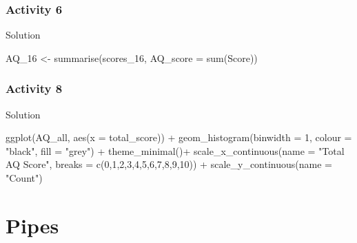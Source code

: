 \documentclass[
  oneside]{book}
\newenvironment{Shaded}{\begin{snugshade}}{\end{snugshade}}
\newcommand{\AttributeTok}[1]{\textcolor[rgb]{0.77,0.63,0.00}{#1}}
\newcommand{\DecValTok}[1]{\textcolor[rgb]{0.00,0.00,0.81}{#1}}
\newcommand{\FunctionTok}[1]{\textcolor[rgb]{0.00,0.00,0.00}{#1}}
\newcommand{\NormalTok}[1]{#1}
\newcommand{\OtherTok}[1]{\textcolor[rgb]{0.56,0.35,0.01}{#1}}
\newcommand{\SpecialCharTok}[1]{\textcolor[rgb]{0.00,0.00,0.00}{#1}}
\newcommand{\StringTok}[1]{\textcolor[rgb]{0.31,0.60,0.02}{#1}}
\begin{document}
\hypertarget{activity-6-2}{%
\subsection{Activity 6}\label{activity-6-2}}

Solution

\begin{Shaded}
\begin{Highlighting}[]
\NormalTok{AQ\_16 }\OtherTok{\textless{}{-}} \FunctionTok{summarise}\NormalTok{(scores\_16, }\AttributeTok{AQ\_score =} \FunctionTok{sum}\NormalTok{(Score))}
\end{Highlighting}
\end{Shaded}

\hypertarget{activity-8}{%
\subsection{Activity 8}\label{activity-8}}

Solution

\begin{Shaded}
\begin{Highlighting}[]
\FunctionTok{ggplot}\NormalTok{(AQ\_all, }\FunctionTok{aes}\NormalTok{(}\AttributeTok{x =}\NormalTok{ total\_score)) }\SpecialCharTok{+}
  \FunctionTok{geom\_histogram}\NormalTok{(}\AttributeTok{binwidth =} \DecValTok{1}\NormalTok{, }\AttributeTok{colour =} \StringTok{"black"}\NormalTok{, }\AttributeTok{fill =} \StringTok{"grey"}\NormalTok{) }\SpecialCharTok{+}
  \FunctionTok{theme\_minimal}\NormalTok{()}\SpecialCharTok{+}
  \FunctionTok{scale\_x\_continuous}\NormalTok{(}\AttributeTok{name =} \StringTok{"Total AQ Score"}\NormalTok{, }\AttributeTok{breaks =} \FunctionTok{c}\NormalTok{(}\DecValTok{0}\NormalTok{,}\DecValTok{1}\NormalTok{,}\DecValTok{2}\NormalTok{,}\DecValTok{3}\NormalTok{,}\DecValTok{4}\NormalTok{,}\DecValTok{5}\NormalTok{,}\DecValTok{6}\NormalTok{,}\DecValTok{7}\NormalTok{,}\DecValTok{8}\NormalTok{,}\DecValTok{9}\NormalTok{,}\DecValTok{10}\NormalTok{)) }\SpecialCharTok{+}
  \FunctionTok{scale\_y\_continuous}\NormalTok{(}\AttributeTok{name =} \StringTok{"Count"}\NormalTok{)}
\end{Highlighting}
\end{Shaded}

\hypertarget{pipes}{%
\chapter{Pipes}\label{pipes}}
\end{document}

